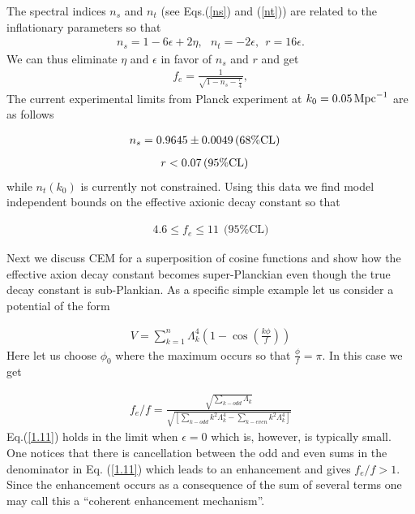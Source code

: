 \documentclass[12pt]{article}
\begin{document}
The spectral indices $n_s$ and $n_t$ (see Eqs.(\ref{ns}) and (\ref{nt}))
are related to the inflationary parameters so that
\begin{align}
  n_s= 1-6\epsilon + 2 \eta, ~~~n_t = -2 \epsilon, ~~ r = 16 \epsilon.
  \label{ns-nt-r}
\end{align}
We can thus eliminate $\eta$ and $\epsilon$ in favor of $n_s$ and $r$ and get
\begin{align}
  f_e=\frac{1}{\sqrt{1-n_s- \frac{r}{4}}},
\end{align}
The current experimental limits from Planck experiment at $k_0=0.05\, {\rm Mpc}^{-1}$ are as follows
~\cite{Adam:2015rua,Ade:2015lrj,Array:2015xqh}

\begin{align}
  n_s & = 0.9645 \pm 0.0049\, (68\% {\rm CL})
\end{align}
\begin{align}
  r & <0.07\, (95\% {\rm CL})
  \label{data}
\end{align}
while $n_t(k_0)$ is currently not constrained. Using this data we find model independent bounds on the effective axionic decay constant
so that

\begin{align}
  4.6 \leq f_e \leq 11 ~~(95\% \text{CL)}
\end{align}

Next we discuss CEM for a superposition of cosine functions and show how the effective axion decay constant becomes super-Planckian
even though the true decay constant is sub-Plankian.
As a specific simple example let us consider a potential of the form

\begin{align}
  V = \sum_{k=1}^n\Lambda_k^4 \left(1-\cos(\frac{k\phi}{ f})\right)
  \label{1.1}
\end{align}
Here let us choose $\phi_0$ where the maximum occurs so that $\frac{\phi}{ f}= \pi$. In this case we get

\begin{align}
  {f_e}/f = \frac{\sqrt{ \sum_{k-odd}\Lambda_k}
  }{ \sqrt{\left[ \sum_{k-odd} k^2\Lambda_k^4 - \sum_{k-even} k^2\Lambda_k^4\right]}}
  \label{1.11}
\end{align}
Eq.(\ref{1.11}) holds in the limit when $\epsilon=0$ which is, however, is typically small.
One notices that there is cancellation between the odd and even sums in the denominator in Eq. (\ref{1.11}) which
leads to an enhancement and gives $f_e/f >1$. Since the enhancement occurs as a consequence of the sum of several terms one
may call this a ``coherent enhancement mechanism''.
\end{document}
